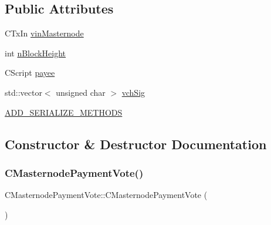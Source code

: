 \subsection*{Public Attributes}
\begin{DoxyCompactItemize}
\item 
C\+Tx\+In \mbox{\hyperlink{class_c_masternode_payment_vote_a1a07779b769a2ca2b10267d61553df94}{vin\+Masternode}}
\item 
int \mbox{\hyperlink{class_c_masternode_payment_vote_ad75d093e53aa3e727a81aea841f4e26d}{n\+Block\+Height}}
\item 
C\+Script \mbox{\hyperlink{class_c_masternode_payment_vote_ab68f835feb0b7130296c642f526ce48b}{payee}}
\item 
std\+::vector$<$ unsigned char $>$ \mbox{\hyperlink{class_c_masternode_payment_vote_ad2c427fe8708689ad611b687d0bc89e0}{vch\+Sig}}
\item 
\mbox{\hyperlink{class_c_masternode_payment_vote_a4e198526440fedc60e0cfae574341c53}{A\+D\+D\+\_\+\+S\+E\+R\+I\+A\+L\+I\+Z\+E\+\_\+\+M\+E\+T\+H\+O\+DS}}
\end{DoxyCompactItemize}


\subsection{Constructor \& Destructor Documentation}
\mbox{\label{class_c_masternode_payment_vote_a91fe054a7e2c78e22bc4d9f3bc4651d1}} 
\subsubsection{\texorpdfstring{C\+Masternode\+Payment\+Vote()}{CMasternodePaymentVote()}\hspace{0.1cm}{\footnotesize\ttfamily [1/2]}}
{\footnotesize\ttfamily C\+Masternode\+Payment\+Vote\+::\+C\+Masternode\+Payment\+Vote (\begin{DoxyParamCaption}{ }\end{DoxyParamCaption})\hspace{0.3cm}{\ttfamily [inline]}}

\mbox{\label{class_c_masternode_payment_vote_ab86247ae754fd4447d721786c3234049}} 
